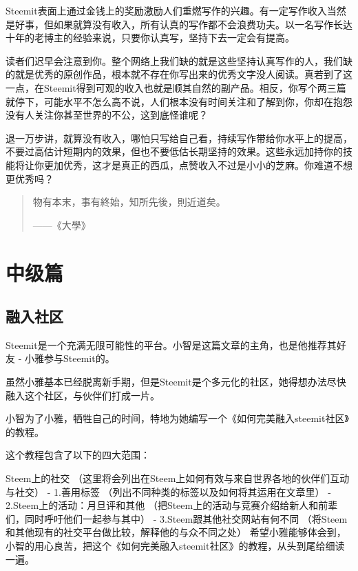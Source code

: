 \documentclass[]{ctexbook}
\begin{document}
Steemit表面上通过金钱上的奖励激励人们重燃写作的兴趣。有一定写作收入当然是好事，但如果就算没有收入，所有认真的写作都不会浪费功夫。以一名写作长达十年的老博主的经验来说，只要你认真写，坚持下去一定会有提高。

读者们迟早会注意到你。整个网络上我们缺的就是这些坚持认真写作的人，我们缺的就是优秀的原创作品，根本就不存在你写出来的优秀文字没人阅读。真若到了这一点，在Steemit得到可观的收入也就是顺其自然的副产品。相反，你写个两三篇就停下，可能水平不怎么高不说，人们根本没有时间关注和了解到你，你却在抱怨没有人关注你甚至世界的不公，这到底怪谁呢？

退一万步讲，就算没有收入，哪怕只写给自己看，持续写作带给你水平上的提高，不要过高估计短期内的效果，但也不要低估长期坚持的效果。这些永远加持你的技能将让你更加优秀，这才是真正的西瓜，点赞收入不过是小小的芝麻。你难道不想更优秀吗？

\begin{quote}
物有本末，事有終始，知所先後，則近道矣。

\begin{flushright}------《大學》\end{flushright}
\end{quote}

\hypertarget{zjp}{%
\part{中级篇}\label{zjp}}

\hypertarget{rrsq}{%
\chapter{融入社区}\label{rrsq}}

Steemit是一个充满无限可能性的平台。小智是这篇文章的主角，也是他推荐其好友 - 小雅参与Steemit的。

虽然小雅基本已经脱离新手期，但是Steemit是个多元化的社区，她得想办法尽快融入这个社区，与伙伴们打成一片。

小智为了小雅，牺牲自己的时间，特地为她编写一个《如何完美融入steemit社区》的教程。

这个教程包含了以下的四大范围：

Steem上的社交 （这里将会列出在Steem上如何有效与来自世界各地的伙伴们互动与社交）
- 1.善用标签 （列出不同种类的标签以及如何将其运用在文章里）
- 2.Steem上的活动：月旦评和其他 （把Steem上的活动与竞赛介绍给新人和前辈们，同时呼吁他们一起参与其中）
- 3.Steem跟其他社交网站有何不同 （将Steem和其他现有的社交平台做比较，解释他的与众不同之处）
希望小雅能够体会到，小智的用心良苦，把这个《如何完美融入steemit社区》的教程，从头到尾给细读一遍。
\end{document}
